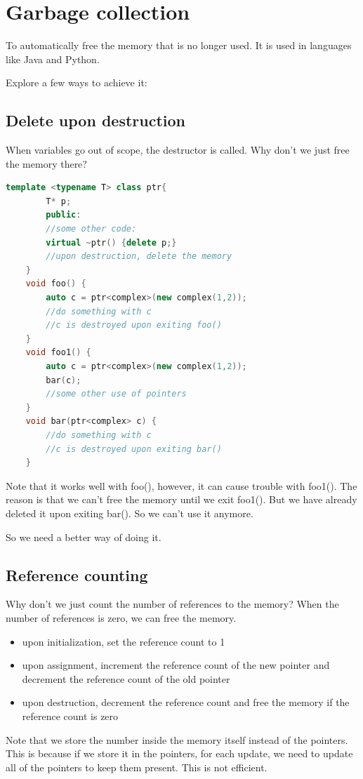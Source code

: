 \documentclass[letterpaper,12pt]{article}
\begin{document}
\section{Garbage collection}
To automatically free the memory that is no longer used. It is used in
languages like Java and Python.

Explore a few ways to achieve it:
\subsection{Delete upon destruction}
When variables go out of scope, the destructor is called. Why don't we just
free the memory there?
\begin{lstlisting}[language=C++]
    template <typename T> class ptr{
        T* p;
        public:
        //some other code:
        virtual ~ptr() {delete p;}
        //upon destruction, delete the memory
    }
    void foo() {
        auto c = ptr<complex>(new complex(1,2));
        //do something with c
        //c is destroyed upon exiting foo()
    }
    void foo1() {
        auto c = ptr<complex>(new complex(1,2));
        bar(c);
        //some other use of pointers
    }
    void bar(ptr<complex> c) {
        //do something with c
        //c is destroyed upon exiting bar()
    }
\end{lstlisting}
Note that it works well with foo(), however, it can cause trouble with foo1().
The reason is that we can't free the memory until we exit foo1(). But we have
already deleted it upon exiting bar(). So we can't use it anymore.

So we need a better way of doing it.
\subsection{Reference counting}
Why don't we just count the number of references to the memory? When the number
of references is zero, we can free the memory.
\begin{itemize}
    \item upon initialization, set the reference count to 1
    \item upon assignment, increment the reference count of the new pointer and decrement
          the reference count of the old pointer
    \item upon destruction, decrement the reference count and free the memory if the
          reference count is zero
\end{itemize}
Note that we store the number inside the memory itself instead of the pointers. This is because if we store it in the pointers, for each update, we need to update all of the pointers to keep them present. This is not efficient.
\end{document}
